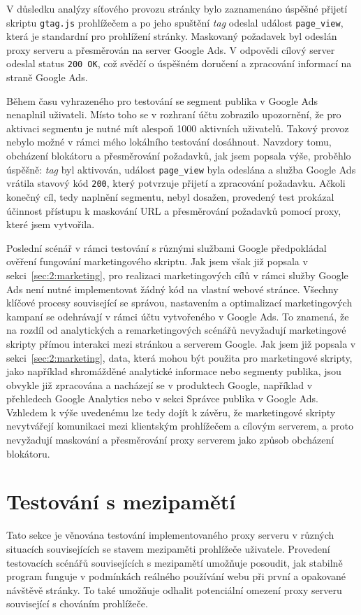V důsledku analýzy síťového provozu stránky bylo zaznamenáno úspěšné přijetí skriptu \texttt{gtag.js} prohlížečem a po jeho spuštění {\it tag} odeslal událost \texttt{page\_view}, která je standardní pro prohlížení stránky. Maskovaný požadavek byl odeslán proxy serveru a přesměrován na server Google Ads. V odpovědi cílový server odeslal status \texttt{200 OK}, což svědčí o úspěšném doručení a zpracování informací na straně Google Ads.

Během času vyhrazeného pro testování se segment publika v Google Ads nenaplnil uživateli. Místo toho se v rozhraní účtu zobrazilo upozornění, že pro aktivaci segmentu je nutné mít alespoň 1000 aktivních uživatelů. Takový provoz nebylo možné v rámci mého lokálního testování dosáhnout.  Navzdory tomu, obcházení blokátoru a přesměrování požadavků, jak jsem popsala výše, proběhlo úspěšně: {\it tag} byl aktivován, událost \texttt{page\_view} byla odeslána a služba Google Ads vrátila stavový kód \texttt{200}, který potvrzuje přijetí a zpracování požadavku. Ačkoli konečný cíl, tedy naplnění segmentu, nebyl dosažen, provedený test prokázal účinnost přístupu k maskování URL a přesměrování požadavků pomocí proxy, které jsem vytvořila.

Poslední scénář v rámci testování s různými službami Google předpokládal ověření fungování marketingového skriptu. Jak jsem však již popsala v sekci~\ref{sec:2:marketing}, pro realizaci marketingových cílů v rámci služby Google Ads není nutné implementovat žádný kód na vlastní webové stránce. Všechny klíčové procesy související se správou, nastavením a optimalizací marketingových kampaní se odehrávají v rámci účtu vytvořeného v Google Ads. To znamená, že na rozdíl od analytických a remarketingových scénářů nevyžadují marketingové skripty přímou interakci mezi stránkou a serverem Google. Jak jsem již popsala v sekci~\ref{sec:2:marketing}, data, která mohou být použita pro marketingové skripty, jako například shromážděné analytické informace nebo segmenty publika, jsou obvykle již zpracována a nacházejí se v produktech Google, například v přehledech Google Analytics nebo v sekci Správce publika v Google Ads. Vzhledem k výše uvedenému lze tedy dojít k závěru, že marketingové skripty nevytvářejí komunikaci mezi klientským prohlížečem a cílovým serverem, a proto nevyžadují maskování a přesměrování proxy serverem jako způsob obcházení blokátoru. 

\section{Testování s mezipamětí}
Tato sekce je věnována testování implementovaného proxy serveru v různých situacích souvisejících se stavem mezipaměti prohlížeče uživatele. Provedení testovacích scénářů souvisejících s mezipamětí umožňuje posoudit, jak stabilně program funguje v podmínkách reálného používání webu při první a opakované návštěvě stránky. To také umožňuje odhalit potenciální omezení proxy serveru související s chováním prohlížeče. 

